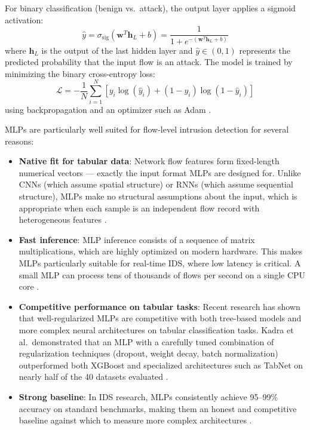 \par For binary classification (benign vs.\ attack), the output layer applies a sigmoid activation:
\begin{equation}
    \hat{y} = \sigma_{\text{sig}}(\mathbf{w}^T \mathbf{h}_L + b) = \frac{1}{1 + e^{-(\mathbf{w}^T \mathbf{h}_L + b)}}
    \label{eq:mlp_output}
\end{equation}
where $\mathbf{h}_L$ is the output of the last hidden layer and $\hat{y} \in (0, 1)$ represents the predicted probability that the input flow is an attack. The model is trained by minimizing the binary cross-entropy loss:
\begin{equation}
    \mathcal{L} = -\frac{1}{N} \sum_{i=1}^{N} \left[ y_i \log(\hat{y}_i) + (1 - y_i) \log(1 - \hat{y}_i) \right]
    \label{eq:bce_loss}
\end{equation}
using backpropagation and an optimizer such as Adam \cite{Vinayakumar2019}.

\par MLPs are particularly well suited for flow-level intrusion detection for several reasons:

\begin{itemize}
    \item \textbf{Native fit for tabular data}: Network flow features form fixed-length numerical vectors --- exactly the input format MLPs are designed for. Unlike CNNs (which assume spatial structure) or RNNs (which assume sequential structure), MLPs make no structural assumptions about the input, which is appropriate when each sample is an independent flow record with heterogeneous features \cite{Kadra2021}.
    \item \textbf{Fast inference}: MLP inference consists of a sequence of matrix multiplications, which are highly optimized on modern hardware. This makes MLPs particularly suitable for real-time IDS, where low latency is critical. A small MLP can process tens of thousands of flows per second on a single CPU core \cite{Vinayakumar2019}.
    \item \textbf{Competitive performance on tabular tasks}: Recent research has shown that well-regularized MLPs are competitive with both tree-based models and more complex neural architectures on tabular classification tasks. Kadra et al.\ demonstrated that an MLP with a carefully tuned combination of regularization techniques (dropout, weight decay, batch normalization) outperformed both XGBoost and specialized architectures such as TabNet on nearly half of the 40 datasets evaluated \cite{Kadra2021}.
    \item \textbf{Strong baseline}: In IDS research, MLPs consistently achieve 95--99\% accuracy on standard benchmarks, making them an honest and competitive baseline against which to measure more complex architectures \cite{Vinayakumar2019, Ferrag2020}.
\end{itemize}

